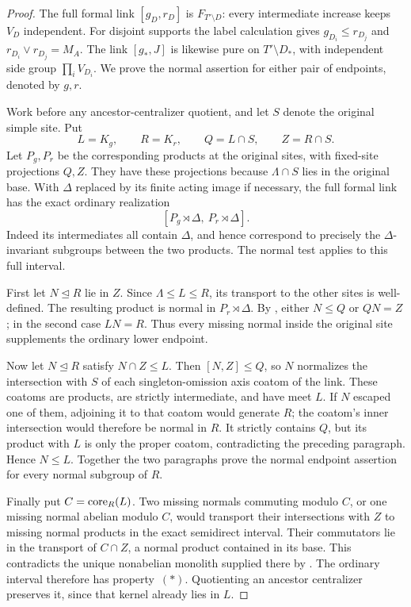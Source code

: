 \begin{proof}

The full formal link \([g_D,r_D]\) is \(F_{T'\setminus D}\):
every intermediate increase keeps \(V_D\) independent.  For disjoint
supports the label calculation gives \(g_{D_i}\le r_{D_j}\) and
\(r_{D_i}\vee r_{D_j}=M_A\).  The link \([g_*,J]\) is likewise
pure on \(T'\setminus D_*\), with independent side group
\(\prod_i V_{D_i}\).  We prove the normal assertion for either
pair of endpoints, denoted by \(g,r\).

Work before any ancestor-centralizer quotient, and let \(S\) denote
the original simple site.  Put
\[
 L=K_g,\qquad R=K_r,\qquad Q=L\cap S,\qquad Z=R\cap S.
\]
Let \(P_g,P_r\) be the corresponding products at the original sites,
with fixed-site projections \(Q,Z\).  They have these projections
because \(\Lambda\cap S\) lies in the original base.  With
\(\Delta\) replaced by its finite acting image if necessary, the
full formal link has the exact ordinary realization
\[
 [P_g\rtimes\Delta,\ P_r\rtimes\Delta].
\]
Indeed its intermediates all contain \(\Delta\), and hence correspond
to precisely the \(\Delta\)-invariant subgroups between the two
products.  The normal test applies to this full interval.

First let \(N\trianglelefteq R\) lie in \(Z\).  Since
\(\Lambda\le L\le R\), its transport to the other sites is
well-defined.  The resulting product is normal in
\(P_r\rtimes\Delta\).  By , either
\(N\le Q\) or \(QN=Z\); in the second case \(LN=R\).
Thus every missing normal inside the original site supplements the
ordinary lower endpoint.

Now let \(N\trianglelefteq R\) satisfy \(N\cap Z\le L\).
Then \([N,Z]\le Q\), so \(N\) normalizes the intersection with
\(S\) of each singleton-omission axis coatom of the link.  These
coatoms are products, are strictly intermediate, and have meet \(L\).
If \(N\) escaped one of them, adjoining it to that coatom would
generate \(R\); the coatom's inner intersection would therefore be
normal in \(R\).  It strictly contains \(Q\), but its product
with \(L\) is only the proper coatom, contradicting the preceding
paragraph.  Hence \(N\le L\).  Together the two paragraphs prove
the normal endpoint assertion for every normal subgroup of \(R\).

Finally put \(C=\operatorname{core}_R(L)\).  Two missing normals commuting modulo
\(C\), or one missing normal abelian modulo \(C\), would transport
their intersections with \(Z\) to missing normal products in the
exact semidirect interval.  Their commutators lie in the transport of
\(C\cap Z\), a normal product contained in its base.  This contradicts
the unique nonabelian monolith supplied there by .
The ordinary interval therefore has property~\((*)\).  Quotienting
an ancestor centralizer preserves it, since that kernel already lies
in \(L\).

\end{proof}

